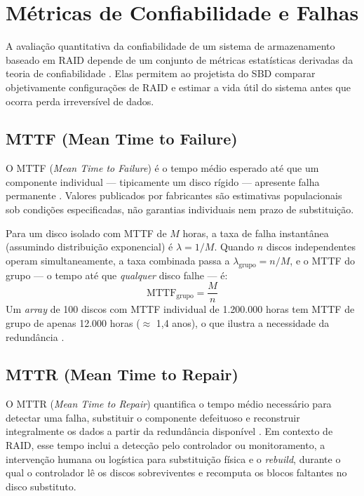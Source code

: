 \documentclass[titlepage]{article}
\begin{document}
\section{Métricas de Confiabilidade e Falhas}
\label{sec:metricas_confiabilidade}
A avaliação quantitativa da confiabilidade de um sistema de armazenamento baseado em RAID depende de um conjunto de métricas estatísticas derivadas da teoria de confiabilidade \cite{silberschatz2020}. Elas permitem ao projetista do SBD comparar objetivamente configurações de RAID e estimar a vida útil do sistema antes que ocorra perda irreversível de dados.

\subsection{MTTF (Mean Time to Failure)}
O MTTF (\textit{Mean Time to Failure}) é o tempo médio esperado até que um componente individual --- tipicamente um disco rígido --- apresente falha permanente \cite{silberschatz2020}. Valores publicados por fabricantes são estimativas populacionais sob condições especificadas, não garantias individuais nem prazo de substituição.

Para um disco isolado com MTTF de $M$ horas, a taxa de falha instantânea (assumindo distribuição exponencial) é $\lambda = 1/M$. Quando $n$ discos independentes operam simultaneamente, a taxa combinada passa a $\lambda_{\text{grupo}} = n/M$, e o MTTF do grupo --- o tempo até que \textit{qualquer} disco falhe --- é:
\begin{equation}
    \text{MTTF}_{\text{grupo}} = \frac{M}{n}
    \label{eq:mttf_grupo}
\end{equation}
Um \textit{array} de 100 discos com MTTF individual de 1.200.000 horas tem MTTF de grupo de apenas 12.000 horas ($\approx$ 1,4 anos), o que ilustra a necessidade da redundância \cite{silberschatz2020}.

\subsection{MTTR (Mean Time to Repair)}
O MTTR (\textit{Mean Time to Repair}) quantifica o tempo médio necessário para detectar uma falha, substituir o componente defeituoso e reconstruir integralmente os dados a partir da redundância disponível \cite{silberschatz2020}. Em contexto de RAID, esse tempo inclui a detecção pelo controlador ou monitoramento, a intervenção humana ou logística para substituição física e o \textit{rebuild}, durante o qual o controlador lê os discos sobreviventes e recomputa os blocos faltantes no disco substituto.
\end{document}
